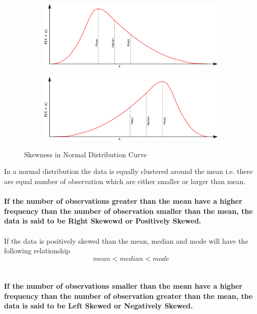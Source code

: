 \documentclass[twoside,12pt]{report}  %
\begin{document}
\begin{figure}[H]
	\centering
	\begin{subfigure}[b]{0.3\textwidth}
		\includegraphics[width=\textwidth]{./images/normal_left.png}
	\end{subfigure}
	\begin{subfigure}[b]{0.3\textwidth}
		\includegraphics[width=\textwidth]{./images/normal_right.png}
	\end{subfigure}
	\caption{Skewness in Normal Distribution Curve}
\end{figure}
\noindent
In a normal distribution the data is equally clustered around the mean i.e. there are equal number of observation which are either smaller or larger than mean.
\\
\\
\textbf{If the number of observations greater than the mean have a higher frequency than the number of observation smaller than the mean, the data is said to be Right Skewewd or Positively Skewed.}
\\
\\
If the data is positively skewed than the mean, median and mode will have the following relationship
$$ mean < median < mode $$
\\
\\
\textbf{If the number of observations smaller than the mean have a higher frequency than the number of observation greater than the mean, the data is said to be Left Skewed or Negatively Skewed.}
\end{document}
